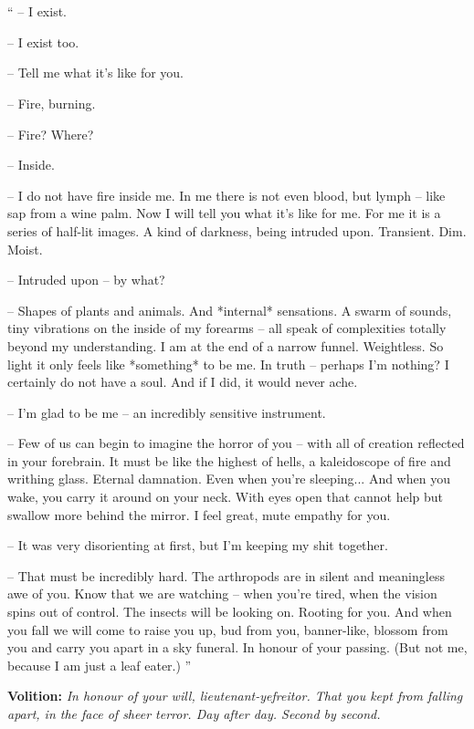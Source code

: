 \chapter*{}
\vspace{-100pt}
`` -- I exist.

-- I exist too.

-- Tell me what it's like for you.

-- Fire, burning.

-- Fire? Where?

-- Inside.

-- I do not have fire inside me. In me there is not even blood, but lymph -- like sap from a wine palm. Now I will tell you what it's like for me. For me it is a series of half-lit images. A kind of darkness, being intruded upon. Transient. Dim. Moist.

-- Intruded upon -- by what?

-- Shapes of plants and animals. And *internal* sensations. A swarm of sounds, tiny vibrations on the inside of my forearms -- all speak of complexities totally beyond my understanding. I am at the end of a narrow funnel. Weightless. So light it only feels like *something* to be me. In truth -- perhaps I'm nothing? I certainly do not have a soul. And if I did, it would never ache.

-- I'm glad to be me -- an incredibly sensitive instrument.

-- Few of us can begin to imagine the horror of you -- with all of creation reflected in your forebrain. It must be like the highest of hells, a kaleidoscope of fire and writhing glass. Eternal damnation. Even when you're sleeping... And when you wake, you carry it around on your neck. With eyes open that cannot help but swallow more behind the mirror. I feel great, mute empathy for you.

-- It was very disorienting at first, but I'm keeping my shit together.

-- That must be incredibly hard. The arthropods are in silent and meaningless awe of you. Know that we are watching -- when you're tired, when the vision spins out of control. The insects will be looking on. Rooting for you. And when you fall we will come to raise you up, bud from you, banner-like, blossom from you and carry you apart in a sky funeral. In honour of your passing. (But not me, because I am just a leaf eater.) ''

\textcolor{Periwinkle}{\bf{Volition:}} \emph{In honour of your will, lieutenant-yefreitor. That you kept from falling apart, in the face of sheer terror. Day after day. Second by second.}





